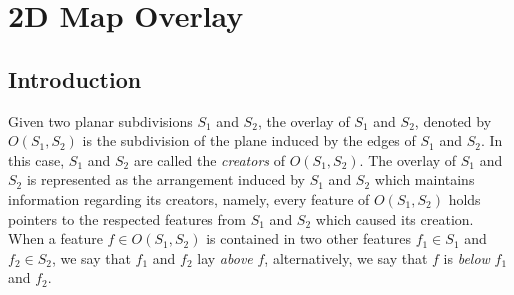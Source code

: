 



\chapter{2D Map Overlay}
\label{chap:map_overlay_2_ref}
\section{Introduction}

Given two planar subdivisions $S_1$ and $S_2$, the overlay of 
$S_1$ and $S_2$, denoted by $O(S_1,S_2)$ is the subdivision 
of the plane induced by the edges of $S_1$ and $S_2$.
In this case, $S_1$ and $S_2$ are called the {\em creators} 
of $O(S_1,S_2)$. The overlay of $S_1$ and $S_2$ is represented as the 
arrangement induced by $S_1$ and $S_2$ which maintains information 
regarding its creators, namely, every feature of $O(S_1,S_2)$ holds pointers 
to the respected features from $S_1$ and $S_2$ which caused its creation.
When a feature $f \in O(S_1,S_2)$ is contained in two other features 
$f_1 \in S_1$ and $f_2 \in S_2$, we say that $f_1$ and $f_2$ 
lay {\em above} $f$, alternatively, we say that 
$f$ is {\em below} $f_1$ and $f_2$.


